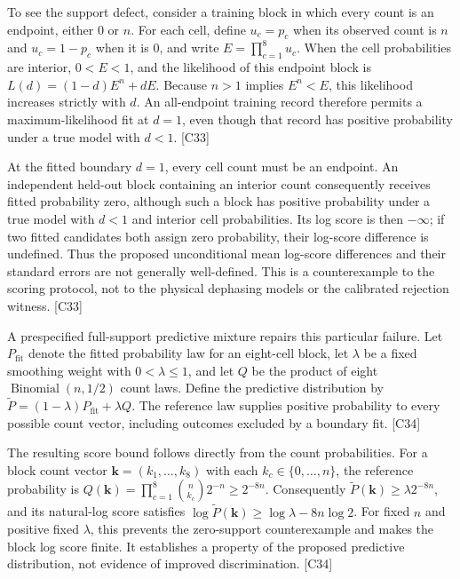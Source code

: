 \documentclass[11pt]{article}
\begin{document}
To see the support defect, consider a training block in which every count is an endpoint, either $0$ or $n$. For each cell, define $u_c=p_c$ when its observed count is $n$ and $u_c=1-p_c$ when it is $0$, and write $E=\prod_{c=1}^{8}u_c$. When the cell probabilities are interior, $0<E<1$, and the likelihood of this endpoint block is $L(d)=(1-d)E^n+dE$. Because $n>1$ implies $E^n<E$, this likelihood increases strictly with $d$. An all-endpoint training record therefore permits a maximum-likelihood fit at $d=1$, even though that record has positive probability under a true model with $d<1$. [C33]

At the fitted boundary $d=1$, every cell count must be an endpoint. An independent held-out block containing an interior count consequently receives fitted probability zero, although such a block has positive probability under a true model with $d<1$ and interior cell probabilities. Its log score is then $-\infty$; if two fitted candidates both assign zero probability, their log-score difference is undefined. Thus the proposed unconditional mean log-score differences and their standard errors are not generally well-defined. This is a counterexample to the scoring protocol, not to the physical dephasing models or the calibrated rejection witness. [C33]

A prespecified full-support predictive mixture repairs this particular failure. Let $P_{\mathrm{fit}}$ denote the fitted probability law for an eight-cell block, let $\lambda$ be a fixed smoothing weight with $0<\lambda\leq1$, and let $Q$ be the product of eight $\operatorname{Binomial}(n,1/2)$ count laws. Define the predictive distribution by $\widetilde P=(1-\lambda)P_{\mathrm{fit}}+\lambda Q$. The reference law supplies positive probability to every possible count vector, including outcomes excluded by a boundary fit. [C34]

The resulting score bound follows directly from the count probabilities. For a block count vector $\mathbf{k}=(k_1,\ldots,k_8)$ with each $k_c\in\{0,\ldots,n\}$, the reference probability is $Q(\mathbf{k})=\prod_{c=1}^{8}\binom{n}{k_c}2^{-n}\geq2^{-8n}$. Consequently $\widetilde P(\mathbf{k})\geq\lambda2^{-8n}$, and its natural-log score satisfies $\log\widetilde P(\mathbf{k})\geq\log\lambda-8n\log2$. For fixed $n$ and positive fixed $\lambda$, this prevents the zero-support counterexample and makes the block log score finite. It establishes a property of the proposed predictive distribution, not evidence of improved discrimination. [C34]
\end{document}
